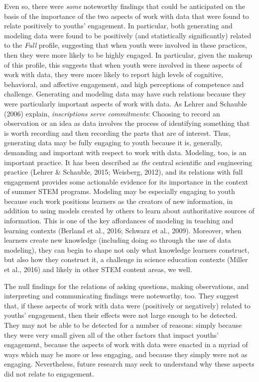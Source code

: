 \documentclass[]{msu-thesis}
\theoremstyle{definition}
\theoremstyle{definition}
\theoremstyle{definition}
\theoremstyle{remark}
\begin{document}
Even so, there were \emph{some} noteworthy findings that could be
anticipated on the basis of the importance of the two aspects of work
with data that were found to relate positively to youths' engagement. In
particular, both generating and modeling data were found to be
positively (and statistically significantly) related to the \emph{Full}
profile, suggesting that when youth were involved in these practices,
then they were more likely to be highly engaged. In particular, given
the makeup of this profile, this suggests that when youth were involved
in these aspects of work with data, they were more likely to report high
levels of cognitive, behavioral, and affective engagement, and high
perceptions of competence and challenge. Generating and modeling data
may have such relations because they were particularly important aspects
of work with data. As Lehrer and Schauble (2006) explain,
\emph{inscriptions serve commitments}: Choosing to record an observation
or an idea as data involves the process of identifying something that is
worth recording and then recording the parts that are of interest. Thus,
generating data may be fully engaging to youth because it is, generally,
demanding and important with respect to work with data. Modeling, too,
is an important practice. It has been described as \emph{the} central
scientific and engineering practice (Lehrer \& Schauble, 2015; Weisberg,
2012), and its relations with full engagement provides some actionable
evidence for its importance in the context of summer STEM programs.
Modeling may be especially engaging to youth because such work positions
learners as the creators of new information, in addition to using models
created by others to learn about authoritative sources of information.
This is one of the key affordances of modeling in teaching and learning
contexts (Berland et al., 2016; Schwarz et al., 2009). Moreover, when
learners create new knowledge (including doing so through the use of
data modeling), they can begin to shape not only what knowledge learners
construct, but also how they construct it, a challenge in science
education contexts (Miller et al., 2016) and likely in other STEM
content areas, we well.

The null findings for the relations of asking questions, making
observations, and interpreting and communicating findings were
noteworthy, too. They suggest that, if these aspects of work with data
were (positively or negatively) related to youths' engagement, then
their effects were not large enough to be detected. They may not be able
to be detected for a number of reasons: simply because they were very
small given all of the other factors that impact youths' engagement,
because the aspects of work with data were enacted in a myriad of ways
which may be more or less engaging, and because they simply were not as
engaging. Nevertheless, future research may seek to understand why these
aspects did not relate to engagement.
\end{document}
